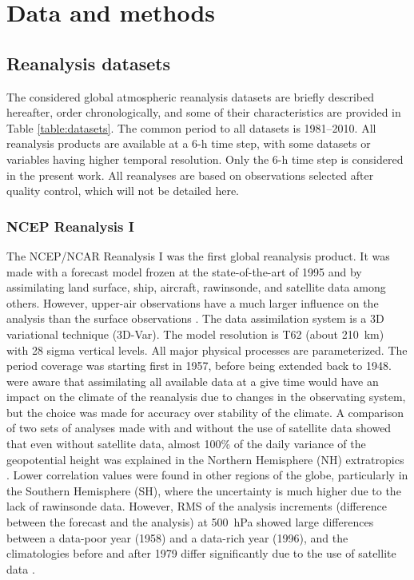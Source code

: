 \documentclass{ametsoc}
\begin{document}
\section{Data and methods}
\label{sec:data}

\subsection{Reanalysis datasets}

The considered global atmospheric reanalysis datasets are briefly described hereafter, order chronologically, and some of their characteristics are provided in Table \ref{table:datasets}. The common period to all datasets is 1981--2010. All reanalysis products are available at a 6-h time step, with some datasets or variables having higher temporal resolution. Only the 6-h time step is considered in the present work. All reanalyses are based on observations selected after quality control, which will not be detailed here. 


\subsubsection{NCEP Reanalysis I}

The NCEP/NCAR Reanalysis I \citep[NR-1,][]{Kalnay1996, Kistler2001} was the first global reanalysis product. It was made with a forecast model frozen at the state-of-the-art of 1995 and by assimilating land surface, ship, aircraft, rawinsonde, and satellite data among others. However, upper-air observations have a much larger influence on the analysis than the surface observations \citep{Kistler2001}. The data assimilation system is a 3D variational technique (3D-Var). The model resolution is T62 (about 210~km) with 28 sigma vertical levels. All major physical processes are parameterized. The period coverage was starting first in 1957, before being extended back to 1948. \citet{Kalnay1996} were aware that assimilating all available data at a give time would have an impact on the climate of the reanalysis due to changes in the observating system, but the choice was made for accuracy over stability of the climate. A comparison of two sets of analyses made with and without the use of satellite data showed that even without satellite data, almost 100\% of the daily variance of the geopotential height was explained in the Northern Hemisphere (NH) extratropics \citep{Kalnay1996}. Lower correlation values were found in other regions of the globe, particularly in the Southern Hemisphere (SH), where the uncertainty is much higher due to the lack of rawinsonde data. However, RMS of the analysis increments (difference between the forecast and the analysis) at 500~hPa showed large differences between a data-poor year (1958) and a data-rich year (1996), and the climatologies before and after 1979 differ significantly due to the use of satellite data \citep{Kistler2001}.
\end{document}
